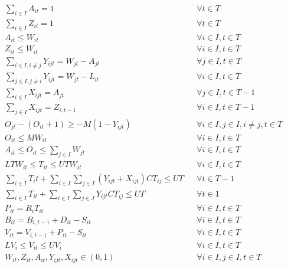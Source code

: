 \documentclass[a4paper,11pt,fleqn]{report}
\begin{document}
    \begin{align}
        \label{Asignment1}
            \sum_{i \in I} A_{it} = 1 &&  \forall t \in T\\
        \label{Asignment2}
            \sum_{i \in I} Z_{it} = 1 &&  \forall t \in T\\
        \label{Asignment3}
            A_{it} \leq W_{it} && \forall i\in I, t \in T \\
        \label{Asignment4}
            Z_{it} \leq W_{it} && \forall i\in I, t \in T \\
%
        \label{Changeover1} 
             \sum_{i \in I, i \neq j } Y_{ijt} = W_{jt} - A_{jt} && \forall j\in I, t \in T\\
        \label{Changeover2} 
             \sum_{j \in I, j \neq i } Y_{ijt} = W_{jt} - L_{it} && \forall  i\in I, t \in T\\
        \label{Changeover3} 
             \sum_{i \in I}  X_{ijt} = A_{jt} && \forall j\in I, t\in T-{1}\\
        \label{Changeover4} 
             \sum_{j \in I} X_{ijt} = Z_{i,t-1} && \forall i \in I, t \in T - {1}\\
%
        \label{Subtour elimination1}
            O_{jt} - (O_{it}+1) \geq -M(1- Y_{ijt}) && \forall i \in I, j \in I, i \neq j, t \in T\\
        \label{Subtour elimination2}
            O_{it} \leq M W_{it} && \forall i \in I, t \in T\\
        \label{Subtour elimination3}
            A_{it} \leq O_{it} \leq \sum_{j \in I} W_{jt} && \forall i \in I, t \in T\\
        \label{timing1}
            LT W_{it} \leq T_{it} \leq UT W_{it} && \forall i \in I, t \in T\\
            \sum_{i \in I} T_it + \sum_{i \in I} \sum_{j \in I} (Y_{ijt} + X_{ijt})CT_{ij} \leq UT && \forall t \in T - {1}\\
        \label{timing2}
            \sum_{i \in I} T_{it} + \sum_{i \in I} \sum_{j \in J} Y_{ijt} CT_{ij} \leq UT && \forall t\in {1}\\
        \label{Production}
            P_{it} = R_i T_{it} && \forall i \in I, t \in T\\
        \label{Backlog}
            B_{it} = B_{i,t-1} + D_{it} - S_{it} && \forall i \in I, t \in T\\
        \label{Inventory1}
            V_{it} = V_{i,t-1} + P_{it} - S_{it} && \forall i \in I, t \in T\\
         \label{Inventory2}
            LV_i \leq V_{it} \leq UV_i && \forall i \in I, t \in T\\
        \label{Binary}
            W_{it}, Z_{it}, A_{it}, Y_{ijt}, X_{ijt} \in (0,1) && \forall i \in I, j \in I, t \in T
    \end{align}
\end{document}
